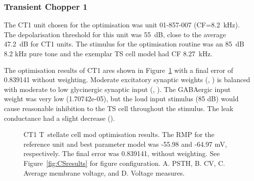 
\clearpage
\subsubsection{Transient Chopper 1}

The CT1 unit chosen for the optimisation was unit 01-857-007 \citep{PaoliniClareyEtAl:2005} (CF=8.2~kHz).
The depolarisation threshold for this unit was 55~dB, close to the average 47.2~dB for CT1 units.
The stimulus for the optimisation routine was an 85~dB 8.2 kHz pure tone and the exemplar TS cell model had CF 8.27~kHz.

The optimisation results of CT1 ares shown in Figure~\ref{fig:CT1results} with a final error of 0.839141 without weighting.
Moderate excitatory synaptic weights (, ) is balanced with moderate to low glycinergic synaptic input (, ).
The GABAergic input weight was very low (\wGLGTS 1.70742e-05), but the loud input stimulus (85 dB) would cause reasonable inhibition to the TS cell throughout the stimulus.
The leak conductance had a slight decrease ().


\begin{figure}[htb]
  \centering
  \caption[CT1 T~stellate Optimisation results]{CT1 T~stellate cell mod optimisation results.
The RMP for the reference unit and best parameter     model was -55.98 and -64.97 mV, respectively.
The final error was 0.839141,     without weighting.
See Figure~\ref{fig:CSresults} for figure configuration.
A. PSTH, B. CV, C. Average membrane voltage, and D. Voltage measures.}
  \label{fig:CT1results}
\end{figure}


